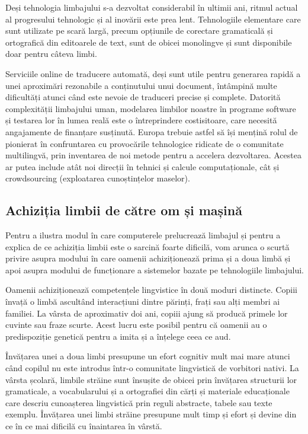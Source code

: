 \begin{multicols}{2}
Deși tehnologia limbajului s-a dezvoltat considerabil în ultimii ani, ritmul actual al progresului tehnologic și al inovării este prea lent. Tehnologiile elementare care sunt utilizate pe scară largă, precum opțiunile de corectare gramaticală și ortografică din editoarele de text, sunt de obicei monolingve și sunt disponibile doar pentru câteva limbi. 


Serviciile online de traducere automată, deși sunt utile pentru generarea rapidă a unei aproximări rezonabile a conținutului unui document, întâmpină multe dificultăți atunci când este nevoie de traduceri precise și complete. Datorită complexității limbajului uman, modelarea limbilor noastre în programe software și testarea lor în lumea reală este o întreprindere costisitoare, care necesită angajamente de finanțare susținută. Europa trebuie astfel să își mențină rolul de pionierat în confruntarea cu provocările tehnologice ridicate de o comunitate multilingvă, prin inventarea de noi metode pentru a accelera dezvoltarea. Acestea ar putea include atât noi direcții în tehnici și calcule computaționale, cât și crowdsourcing (exploatarea cunoștințelor maselor).

\subsection{Achiziția limbii de către om și mașină}

Pentru a ilustra modul în care computerele prelucrează limbajul și pentru a explica de ce achiziția limbii este o sarcină foarte dificilă, vom arunca o scurtă privire asupra modului în care oamenii achiziționează prima și a doua limbă și apoi asupra modului de funcționare a sistemelor bazate pe tehnologiile limbajului.


Oamenii achiziționează competențele lingvistice în două moduri distincte. Copiii învață o limbă ascultând interacțiuni dintre părinți, frați sau alți membri ai familiei. La vârsta de aproximativ doi ani, copiii ajung să producă primele lor cuvinte sau fraze scurte. Acest lucru este posibil pentru că oamenii au o predispoziție genetică pentru a imita și a înțelege ceea ce aud.

Învățarea unei a doua limbi presupune un efort cognitiv mult mai mare atunci când copilul nu este introdus într-o comunitate lingvistică de vorbitori nativi. La vârsta școlară, limbile străine sunt însușite de obicei prin învățarea structurii lor gramaticale, a vocabularului și a ortografiei din cărți și materiale educaționale care descriu cunoașterea lingvistică prin reguli abstracte, tabele sau texte exemplu. Învățarea unei limbi străine presupune mult timp și efort și devine din ce în ce mai dificilă cu înaintarea în vârstă.


\end{multicols}
